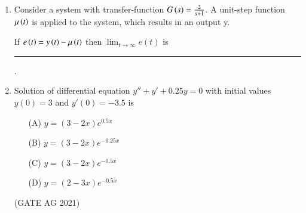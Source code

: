 \begin{enumerate}[label=\thechapter.\arabic*,ref=\thechapter.\theenumi]
\begin{figure}[!ht]
\end{figure}
\solution

\pagebreak
\item Consider a system with transfer-function $G\left(s\right)=\frac{2}{s+1}$. A unit-step function $\mu\left(t\right)$ is applied to the system, which results in an output y. 

If $e\left(t\right)=y\left(t\right)-\mu\left(t\right)$ then $ \lim_{t\to\infty} e(t)$ is\rule{1.5cm}{0.15mm}.
\solution

\pagebreak
\item  Solution of differential equation $y'' + y'+ 0.25y = 0$ with initial values $y(0) = 3$ and $y'(0) = -3.5$ is
\begin{enumerate}
    \item[(A)] $ y = (3-2x)e^{0.5x} $
    \item[(B)] $ y = (3-2x)e^{-0.25x}$
    \item[(C)] $ y = (3-2x)e^{-0.5x}$
    \item[(D)] $ y = (2-3x)e^{-0.5x}$
\end{enumerate} 
\hfill(GATE AG 2021) \\
\solution

\end{enumerate}
